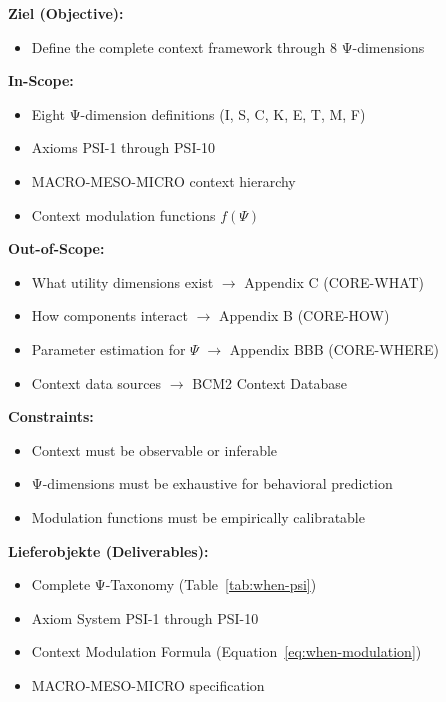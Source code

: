 
\begin{tcolorbox}[
    colback=orange!5!white,
    colframe=orange!75!black,
    title={\textbf{Appendix Scope: Ziel / In-Scope / Out-of-Scope / Constraints}},
    fonttitle=\bfseries
]

\textbf{Ziel (Objective):}
\begin{itemize}[nosep]
    \item Define the complete context framework through 8 Ψ-dimensions
\end{itemize}

\textbf{In-Scope:}
\begin{itemize}[nosep]
    \item Eight Ψ-dimension definitions (I, S, C, K, E, T, M, F)
    \item Axioms PSI-1 through PSI-10
    \item MACRO-MESO-MICRO context hierarchy
    \item Context modulation functions $f(\Psi)$
\end{itemize}

\textbf{Out-of-Scope:}
\begin{itemize}[nosep]
    \item What utility dimensions exist $\rightarrow$ Appendix C (CORE-WHAT)
    \item How components interact $\rightarrow$ Appendix B (CORE-HOW)
    \item Parameter estimation for $\Psi$ $\rightarrow$ Appendix BBB (CORE-WHERE)
    \item Context data sources $\rightarrow$ BCM2 Context Database
\end{itemize}

\textbf{Constraints:}
\begin{itemize}[nosep]
    \item Context must be observable or inferable
    \item Ψ-dimensions must be exhaustive for behavioral prediction
    \item Modulation functions must be empirically calibratable
\end{itemize}

\textbf{Lieferobjekte (Deliverables):}
\begin{itemize}[nosep]
    \item Complete Ψ-Taxonomy (Table~\ref{tab:when-psi})
    \item Axiom System PSI-1 through PSI-10
    \item Context Modulation Formula (Equation~\ref{eq:when-modulation})
    \item MACRO-MESO-MICRO specification
\end{itemize}

\end{tcolorbox}

